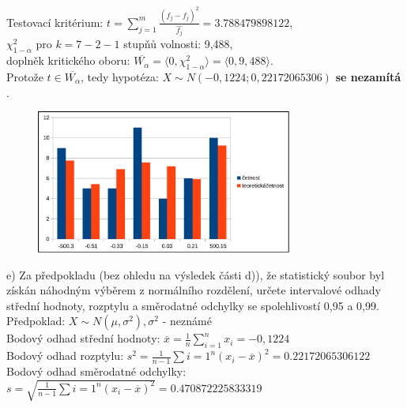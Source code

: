 \documentclass[11pt,a4paper]{article}
\begin{document}
Testovací kritérium: $ t = \sum\limits_{j=1}^{m} \frac{(f_j - \widehat{f_j})^2}{\widehat{f_j}} = 3.788479898122$, \\

$\chi_{1-\alpha}^2$ pro $ k = 7 - 2 - 1$ stupňů volnosti: 9,488, \\

doplněk kritického oboru: $ \overline{W_{\alpha}} = \langle 0, \chi_{1-\alpha}^2 \rangle = \langle 0, 9,488 \rangle$. \\

Protože $ t \in \overline{W_{\alpha}} $, tedy hypotéza: $ X \sim N(-0,1224; 0,22172065306) $ \textbf{se nezamítá} . \\

\begin{figure}[H]
    \centering
    \includegraphics[width=0.75\textwidth]{img/1dhistogram.pdf}
\end{figure}

\noindent\makebox[\linewidth]{\rule{\textwidth}{0.4pt}}

e) Za předpokladu (bez ohledu na výsledek části d)), že statistický soubor byl získán náhodným výběrem z normálního rozdělení, určete intervalové odhady střední hodnoty, rozptylu a směrodatné
odchylky se spolehlivostí 0,95 a 0,99. \\

Předpoklad: $ X \sim N(\mu, \sigma^2), \sigma^2$ - neznámé \\

Bodový odhad střední hodnoty: $ \overline{x} = \frac{1}{n} \sum\limits_{i=1}^{n} x_i = -0,1224 $ \\

Bodový odhad rozptylu: $ s^2 = \frac{1}{n-1} \sum\limits{i=1}^{n} (x_i - \overline{x})^2 = 0.22172065306122 $ \\

Bodový odhad směrodatné odchylky: $ s = \sqrt{\frac{1}{n-1} \sum\limits{i=1}^{n} (x_i - \overline{x})^2} = 0.470872225833319 $ \\ 
\end{document}
